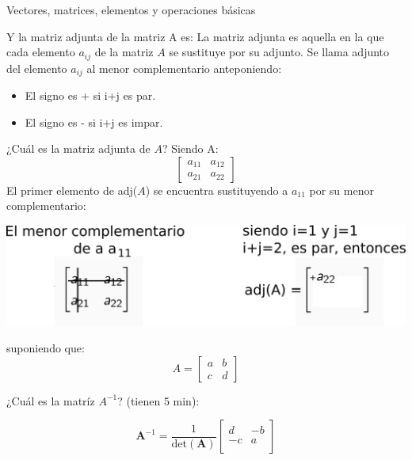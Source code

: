\documentclass[aspectratio=169]{beamer}
\begin{document}
\begin{frame}
 {Vectores, matrices, elementos y operaciones b\'asicas}
 
\vskip -0.2cm
{\color{black}
Y la matriz adjunta de la matriz A es:
\vskip -0.2cm
La matriz adjunta es aquella en la que cada elemento $a_{ij}$ de la matriz $A$ se sustituye por su adjunto. Se llama adjunto del elemento $a_{ij}$ al menor complementario anteponiendo:
\vskip -0.2cm
\begin{itemize}
 \item {\color{black} El signo es + si i+j es par.}
 \item {\color{black} El signo es - si i+j es impar.}
\end{itemize} 
\vskip -0.2cm
¿Cuál es la matriz adjunta de $A$? Siendo A:
\vskip -0.4cm
\begin{equation*}
 \begin{bmatrix}
  a_{11} & a_{12} \\
  a_{21} & a_{22}
 \end{bmatrix}
\end{equation*}
\pause
\vskip -0.4cm
El primer elemento de adj($A$) se encuentra sustituyendo a $a_{11}$ por su menor complementario:

\begin{center}
\vskip -0.6cm \includegraphics[width=0.6\linewidth]{images/adjunta.png} 
\end{center}
}

\end{frame}



\begin{frame}
 
  suponiendo que:
 \vskip -0.5cm
 \begin{equation*}
  A = \begin{bmatrix}
       a & b \\
       c & d
      \end{bmatrix}
 \end{equation*}

¿Cuál es la matríz $A^{-1}$? (tienen 5 min):

\pause
\pause
\begin{equation*}
 \mathbf{A}^{-1} = \frac{1}{\text{det}(\mathbf{A})} \begin{bmatrix}
d & -b \\
-c & a \\
\end{bmatrix}
\end{equation*}

 
\end{frame}
\end{document}
